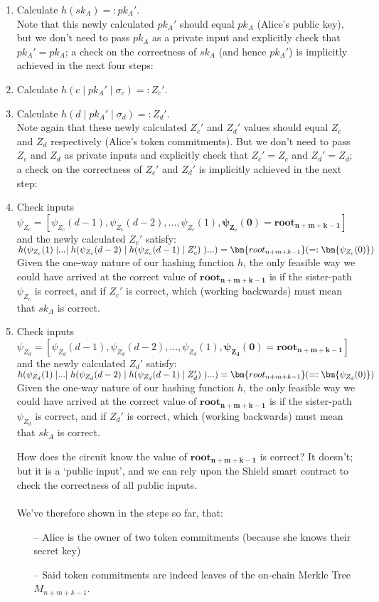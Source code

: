 \documentclass{article}
\DeclarePairedDelimiter\br{(}{)}
\begin{document}
\begin{enumerate}
  \item Calculate $h(sk_A) =: pk_A'$.\\
    Note that this newly calculated $pk_A'$ should equal $pk_A$ (Alice's public key), but we don't need to pass $pk_A$ as a private input and explicitly check that $pk_A'=pk_A$; a check on the correctness of $sk_A$ (and hence $pk_A'$) is implicitly achieved in the next four steps:
  \item Calculate $h(c\;|\;pk_A'\;|\;\sigma_c) =: Z_c'$.\\
  \item Calculate $h(d\;|\;pk_A'\;|\;\sigma_d) =: Z_d'$.\\
    Note again that these newly calculated $Z_c'$ and $Z_d'$ values should equal $Z_c$ and $Z_d$ respectively (Alice's token commitments). But we don't need to pass $Z_c$ and $Z_d$ as private inputs and explicitly check that $Z_c'=Z_c$ and $Z_d'=Z_d$; a check on the correctness of $Z_c'$ and $Z_d'$ is implicitly achieved in the next step:
  \item Check inputs $\psi_{Z_c}=[\psi_{Z_c}(d-1), \psi_{Z_c}(d-2),..., \psi_{Z_c}(1), \bm{\psi_{Z_c}(0)=root_{n+m+k-1}}]$ and the newly calculated $Z_c'$ satisfy:\\
    $h\br*{\psi_{Z_c}(1)\;|...|\;h\br*{\psi_{Z_c}(d-2)\;|\;h\br*{\psi_{Z_c}(d-1)\;|\;Z_c'}\;}...} = \bm{root_{n+m+k-1}} ( =: \bm{\psi_{Z_c}(0)})$\\
    Given the one-way nature of our hashing function $h$, the only feasible way we could have arrived at the correct value of $\bm{root_{n+m+k-1}}$ is if the sister-path $\psi_{Z_c}$ is correct, and if $Z_c'$ is correct, which (working backwards) must mean that $sk_A$ is correct.
  \item Check inputs $\psi_{Z_d}=[\psi_{Z_d}(d-1), \psi_{Z_d}(d-2),..., \psi_{Z_d}(1), \bm{\psi_{Z_d}(0)=root_{n+m+k-1}}]$ and the newly calculated $Z_d'$ satisfy:\\
    $h\br*{\psi_{Z_d}(1)\;|...|\;h\br*{\psi_{Z_d}(d-2)\;|\;h\br*{\psi_{Z_d}(d-1)\;|\;Z_d'}\;}...} = \bm{root_{n+m+k-1}} ( =: \bm{\psi_{Z_d}(0)})$\\
    Given the one-way nature of our hashing function $h$, the only feasible way we could have arrived at the correct value of $\bm{root_{n+m+k-1}}$ is if the sister-path $\psi_{Z_d}$ is correct, and if $Z_d'$ is correct, which (working backwards) must mean that $sk_A$ is correct.

    How does the circuit know the value of $\bm{root_{n+m+k-1}}$ is correct? It doesn't; but it is a `public input', and we can rely upon the Shield smart contract to check the correctness of all public inputs.\\
  \\
  We've therefore shown in the steps so far, that:
  \begin{itemize}
    \item[--] Alice is the owner of two token commitments (because she knows their secret key)
    \item[--] Said token commitments are indeed leaves of the on-chain Merkle Tree $M_{n+m+k-1}$.
  \end{itemize}


\end{enumerate}
\end{document}
